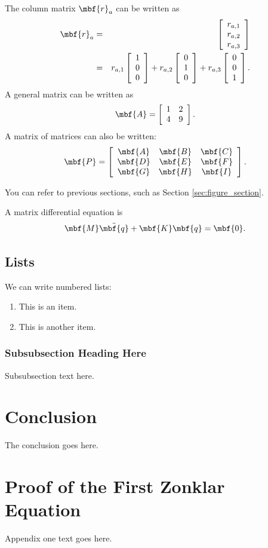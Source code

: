 \documentclass[journal]{IEEEtran}
\newcommand{\bma}[1]{\left[\begin{array}{#1}}
\newcommand{\ema}{\end{array}\right]}
\newcommand{\bdis}{\begin{displaymath}}
\newcommand{\edis}{\end{displaymath}}
\newcommand{\beqarraynn}{\begin{eqnarray*}}
\newcommand{\eeqarraynn}{\end{eqnarray*}}
\begin{document}
The column matrix $\mbf{r}_a$ can be written as
\beqarraynn
	\mbf{r}_a
	& = &
	\bma{c}
		r_{a,1} \\
		r_{a,2} \\
		r_{a,3}
	\ema \\
	& = &
	r_{a,1}
	\bma{c}
		1 \\
		0 \\
		0
	\ema
	+
	r_{a,2}
	\bma{c}
		0 \\
		1 \\
		0
	\ema
	+
	r_{a,3}
	\bma{c}
		0 \\
		0 \\
		1
	\ema .
\eeqarraynn
%
A general matrix can be written as
\bdis
	\mbf{A} 
	=
	\bma{cc}
		1 & 2 \\
		4 & 9
	\ema .
\edis
%
A matrix of matrices can also be written:
\bdis
	\mbf{P}
	=
	\bma{ccc}
		\mbf{A} & \mbf{B} & \mbf{C} \\
		\mbf{D} & \mbf{E} & \mbf{F} \\
		\mbf{G} & \mbf{H} & \mbf{I} \\
	\ema .
\edis

You can refer to previous sections, such as Section \ref{sec:figure_section}.

A matrix differential equation is
\bdis
	\mbf{M} \ddot{\mbf{q}} + \mbf{K} \mbf{q} = \mbf{0} .
\edis

\subsection{Lists}
We can write numbered lists:
\begin{enumerate}

\item This is an item.

\item This is another item. 

\end{enumerate}

\subsubsection{Subsubsection Heading Here}
Subsubsection text here.

\section{Conclusion}
The conclusion goes here.

\appendices
\section{Proof of the First Zonklar Equation}
Appendix one text goes here.
\end{document}
